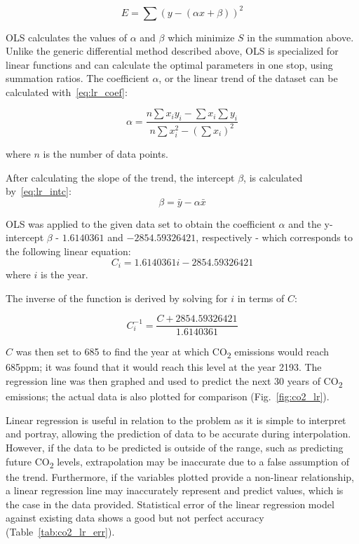 \documentclass[12pt]{mcmthesis}
\begin{document}
    \begin{equation}
        E = \sum{(y - (\alpha x + \beta))^2}
        \label{eq:ls_lr}
    \end{equation}

    OLS calculates the values of $\alpha$ and $\beta$ which minimize $S$ in the summation above.
    Unlike the generic differential method described above, OLS is specialized for linear functions and can calculate the optimal parameters in one stop, using summation ratios.
    The coefficient $\alpha$, or the linear trend of the dataset can be calculated with~\eqref{eq:lr_coef}:

    \begin{equation}
        \alpha = \frac{n \sum x_i y_i - \sum x_i \sum y_i }{n \sum x^2_i - (\sum x_i)^2}
        \label{eq:lr_coef}
    \end{equation}

    \noindent where $n$ is the number of data points.

    After calculating the slope of the trend, the intercept $\beta$, is calculated by~\eqref{eq:lr_intc}:
%
    \begin{equation}
        \beta = \bar y - \alpha \bar x
        \label{eq:lr_intc}
    \end{equation}

    OLS was applied to the given data set to obtain the coefficient $\alpha$ and the y-intercept $\beta$ - $1.6140361$ and $-2854.59326421$, respectively - which corresponds to the following linear equation:
%
    \begin{equation}
        C_i = 1.6140361 i - 2854.59326421
        \label{eq:co2_lr}
    \end{equation}
%
    \noindent where $i$ is the year.

    The inverse of the function is derived by solving for $i$ in terms of $C$:

    \begin{equation}
        C^{-1}_i = \frac{C + 2854.59326421}{1.6140361}
        \label{eq:co2_lr_inv}
    \end{equation}

    $C$ was then set to 685 to find the year at which CO\textsubscript{2} emissions would reach 685ppm; it was found that it would reach this level at the year 2193.
    The regression line was then graphed and used to predict the next 30 years of CO\textsubscript{2} emissions; the actual data is also plotted for comparison (Fig.~\ref{fig:co2_lr}).


    Linear regression is useful in relation to the problem as it is simple to interpret and portray, allowing the prediction of data to be accurate during interpolation.
    However, if the data to be predicted is outside of the range, such as predicting future CO\textsubscript{2} levels, extrapolation may be inaccurate due to a false assumption of the trend.
    Furthermore, if the variables plotted provide a non-linear relationship, a linear regression line may inaccurately represent and predict values, which is the case in the data provided.
    Statistical error of the linear regression model against existing data shows a good but not perfect accuracy (Table~\ref{tab:co2_lr_err}).
\end{document}

